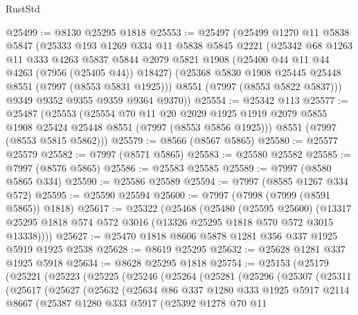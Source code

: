 \begin{lexlean}{RustStd}
\begin{coremodule}
{\begin{coremodule}
{{{{{{{{{{{{{{{{{{{{{{{{{{{{{{{{{{{{{{{{{{{@25499 := @8130 @25295 @1818
@25553 := @25497
    (@25499
      @1270
      @11
      @5838
      @5847
      (@25333
        @193
        @1269
        @334
        @11
        @5838
        @5845
        @2221
        (@25342
          @68
          @1263
          @11
          @333
          @4263
          @5837
          @5844
          @2079
          @5821
          @1908
          (@25400 @44 @11 @44 @4263 (@7956 (@25405 @44)) @18427)
          (@25368 @5830 @1908 @25445 @25448 @8551 (@7997 (@8553 @5831 @1925)))
          @8551
          (@7997 (@8553 @5822 @5837)))
        @9349
        @9352
        @9355
        @9359
        @9364
        @9370))
@25554 := @25342 @113
@25577 := @25487
    (@25553
      (@25554
        @70
        @11
        @20
        @2029
        @1925
        @1919
        @2079
        @5855
        @1908
        @25424
        @25448
        @8551
        (@7997 (@8553 @5856 @1925)))
      @8551
      (@7997 (@8553 @5815 @5862)))
@25579 := @8566 (@8567 @5865)
@25580 := @25577 @25579
@25582 := @7997 (@8571 @5865)
@25583 := @25580 @25582
@25585 := @7997 (@8576 @5865)
@25586 := @25583 @25585
@25589 := @7997 (@8580 @5865 @334)
@25590 := @25586 @25589
@25594 := @7997 (@8585 @1267 @334 @572)
@25595 := @25590 @25594
@25600 := @7997 (@7998 (@7999 (@8591 @5865)) @1818)
@25617 := @25322
    (@25468
      (@25480
        (@25595 @25600)
        (@13317 @25295 @1818 @574 @572 @3016 (@13326 @25295 @1818 @570 @572 @3015 @13338))))
@25627 := @25470 @1818 @8606 @5878 @1281 @356 @337 @1925 @5919 @1925 @2538
@25628 := @8619 @25295
@25632 := @25628 @1281 @337 @1925 @5918
@25634 := @8628 @25295 @1818
@25754 := @25153
    (@25179
      (@25221
        (@25223
          (@25225
            (@25246
              (@25264
                (@25281
                  (@25296
                    (@25307
                      (@25311
                        (@25617
                          (@25627
                            (@25632
                              (@25634
                                @86
                                @337
                                @1280
                                @333
                                @1925
                                @5917
                                @2114
                                @8667
                                (@25387
                                  @1280
                                  @333
                                  @5917
                                  (@25392
                                    @1278
                                    @70
                                    @11
}}}}}}}}}}}}}}}}}}}}}}}}}}}}}}}}}}}}}}}}}}}
\end{coremodule}}
\end{coremodule}
\end{lexlean}
